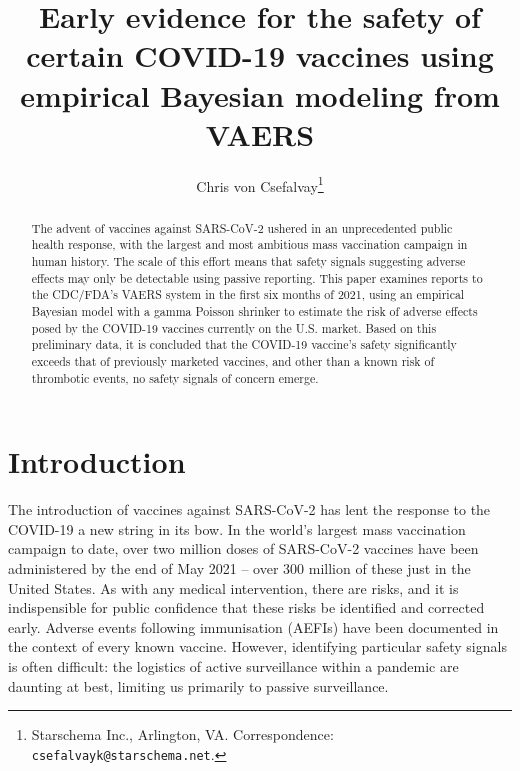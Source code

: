 \documentclass[12pt]{article}
\title{Early evidence for the safety of certain COVID-19 vaccines using  empirical Bayesian modeling from VAERS}
\author{Chris von Csefalvay\thanks{Starschema Inc., Arlington, VA. Correspondence: \texttt{csefalvayk@starschema.net}.}}
\begin{document}
\maketitle

\begin{abstract}
    The advent of vaccines against SARS-CoV-2 ushered in an unprecedented public health response, with the largest and most ambitious mass vaccination campaign in human history. The scale of this effort means that safety signals suggesting adverse effects may only be detectable using passive reporting. This paper examines reports to the CDC/FDA's VAERS system in the first six months of 2021, using an empirical Bayesian model with a gamma Poisson shrinker to estimate the risk of adverse effects posed by the COVID-19 vaccines currently on the U.S. market. Based on this preliminary data, it is concluded that the COVID-19 vaccine's safety significantly exceeds that of previously marketed vaccines, and other than a known risk of thrombotic events, no safety signals of concern emerge.
\end{abstract}

\section{Introduction} %
\label{sec:introduction}

The introduction of vaccines against SARS-CoV-2 has lent the response to the COVID-19 a new string in its bow. In the world's largest mass vaccination campaign to date, \cite{bagcchi2021world,li2021comprehensive,mathieu2021global} over two million doses of SARS-CoV-2 vaccines have been administered by the end of May 2021 – over 300 million of these just in the United States. As with any medical intervention, there are risks, and it is indispensible for public confidence that these risks be identified and corrected early. Adverse events following immunisation (AEFIs) have been documented in the context of every known vaccine. However, identifying particular safety signals is often difficult: the logistics of active surveillance within a pandemic are daunting at best, limiting us primarily to passive surveillance.
\end{document}
